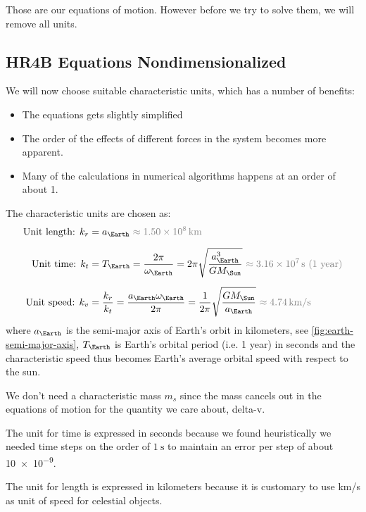 Those are our equations of motion. However before we try to solve them, we will remove all units.

\subsection{HR4B Equations Nondimensionalized}
We will now choose suitable characteristic units, which has a number of benefits:
\begin{itemize}
    \item The equations gets slightly simplified
    \item The order of the effects of different forces in the system becomes more apparent.
    \item Many of the calculations in numerical algorithms happens at an order of about 1. 
\end{itemize}

The characteristic units are chosen as:
\begin{align}
    \text{Unit length: } k_r &= a_{\Earth}\ {\color{gray} \approx \SI{1.50e8}{\km}}  \\[0.2cm]
    \text{Unit time: } k_t &= T_{\Earth} = \frac{2\pi}{\omega_\Earth} = 2\pi \sqrt{\frac{a_\Earth^3}{G M_\Sun}}\ {\color{gray} \approx \SI{3.16e7}{\s} \text{ (1 year)}} \\[0.2cm]
    \text{Unit speed: } k_v &= \frac{k_r}{k_t} = \frac{a_\Earth \omega_\Earth}{2\pi} = \frac{1}{2\pi} \sqrt{\frac{G M_\Sun}{a_\Earth}}\ {\color{gray} \approx \SI{4.74}{\km/\s}}
\end{align}
where \(a_\Earth\) is the semi-major axis of Earth's orbit in kilometers, see \cref{fig:earth-semi-major-axis}, \(T_\Earth\) is Earth's orbital period (i.e. 1 year) in seconds and the characteristic speed thus becomes Earth's average orbital speed with respect to the sun.

We don't need a characteristic mass \(m_s\) since the mass cancels out in the equations of motion for the quantity we care about, delta-v.

The unit for time is expressed in seconds because we found heuristically we needed time steps on the order of \(\SI{1}{\s}\) to maintain an error per step of about \num{10e-9}.

The unit for length is expressed in kilometers because it is customary to use \si{\km/\s} as unit of speed for celestial objects.

